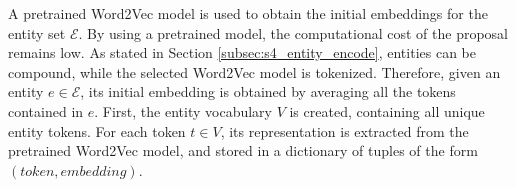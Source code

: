 \begin{table} 
\centering
{}
\caption{Triple classification average precision. recall. and F1 score with and without entity initialization (marked as +SEI)}
\label{tab:exp_entity_init}
\end{table}

A pretrained Word2Vec model is used to obtain the initial embeddings for the entity set $\mathcal{E}$. By using a pretrained model, the computational cost of the proposal remains low. As stated in Section \ref{subsec:s4_entity_encode}, entities can be compound, while the selected Word2Vec model is tokenized. Therefore, given an entity $e \in \mathcal{E}$, its initial embedding is obtained by averaging all the tokens contained in $e$. First, the entity vocabulary $V$ is created, containing all unique entity tokens. For each token $t \in V$, its representation is extracted from the pretrained Word2Vec model, and stored in a dictionary of tuples of the form $(token, embedding)$.

